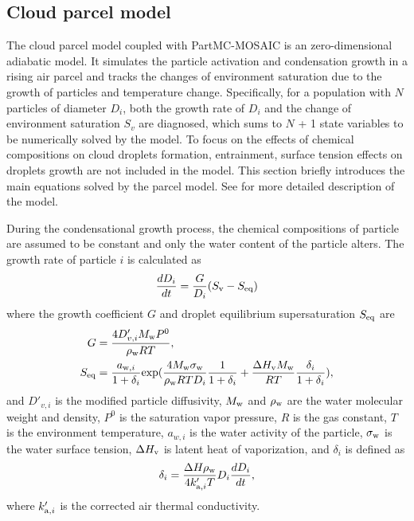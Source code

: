 \documentclass[edeposit,fullpage]{uiucthesis2009}
\begin{document}
\subsection{Cloud parcel model}
\label{section:cloud-parcel-model}
The cloud parcel model coupled with PartMC-MOSAIC is an zero-dimensional adiabatic model. It simulates the particle activation and condensation growth in a rising air parcel and tracks the changes of environment saturation due to the growth of particles and temperature change. Specifically, for a population with $N$ particles of diameter $D_i$, both the growth rate of $D_i$ and the change of environment saturation $S_v$ are diagnosed, which sums to $N$ + 1 state variables to be numerically solved by the model. To focus on the effects of chemical compositions on cloud droplets formation, entrainment, surface tension effects on droplets growth are not included in the model. This section briefly introduces the main equations solved by the parcel model. See \citet{ching2012impacts} for more detailed description of the model. 

During the condensational growth process, the chemical compositions of particle are assumed to be constant and only the water content of the particle alters. The growth rate of particle $i$ is calculated as
\begin{equation}
\centering
\frac{dD_i}{dt} = \frac{G}{D_i}(S_{\rm v}-S_{\rm eq})
\label{eq:cloud-parcel} 
\end{equation}
where the growth coefficient $G$ and droplet equilibrium supersaturation $S_{\rm eq}$ are
\begin{equation}
\centering
\begin{aligned}
 G & = \frac{4D'_{v,i}M_{\rm w}P^0}{\rho_{\rm w}RT}  ,\\
 S_{\rm eq} & = \frac{a_{{\rm w},i}}{1+\delta_i}{\rm exp}(\frac{4M_{\rm w}\sigma_{\rm w}}{\rho_{\rm w}RTD_i}\frac{1}{1+\delta_i} + \frac{\Delta H_{\rm v}M_{\rm w}}{RT}\frac{\delta_i}{1+\delta_i}),
\end{aligned}
\end{equation}
and $D'_{v,i}$ is the modified particle diffusivity, $M_{\rm w}$ and $\rho_{\rm w }$ are the water molecular weight and density, $P^0$ is the saturation vapor pressure, $R$ is the gas constant, $T$ is the environment temperature, $a_{w,i}$ is the water activity of the particle, $\sigma_{\rm w}$ is the water surface tension, $\Delta H_{\rm v}$ is latent heat of vaporization, and $\delta_i$ is defined as 
$$\delta_i = \frac{\Delta H_{\rm }\rho_{\rm w}}{4k'_{{\rm a},i}T}D_i\frac{dD_i}{dt},$$
where $k'_{{\rm a},i}$ is the corrected air thermal conductivity. 
\end{document}
